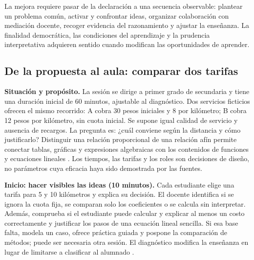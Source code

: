\documentclass[spanish,letterpaper,oneside]{article}
\begin{document}
La mejora requiere pasar de la declaración a una secuencia observable: plantear un problema común, activar y confrontar ideas, organizar colaboración con mediación docente, recoger evidencia del razonamiento y ajustar la enseñanza. La finalidad democrática, las condiciones del aprendizaje y la prudencia interpretativa adquieren sentido cuando modifican las oportunidades de aprender.

\subsection{De la propuesta al aula: comparar dos tarifas}

\textbf{Situación y propósito.} La sesión se dirige a primer grado de secundaria y tiene una duración inicial de 60 minutos, ajustable al diagnóstico. Dos servicios ficticios ofrecen el mismo recorrido: A cobra 30 pesos iniciales y 8 por kilómetro; B cobra 12 pesos por kilómetro, sin cuota inicial. Se supone igual calidad de servicio y ausencia de recargos. La pregunta es: ¿cuál conviene según la distancia y cómo justificarlo? Distinguir una relación proporcional de una relación afín permite conectar tablas, gráficas y expresiones algebraicas con los contenidos de funciones y ecuaciones lineales \citep[p.~59]{sep2024fase6}. Los tiempos, las tarifas y los roles son decisiones de diseño, no parámetros cuya eficacia haya sido demostrada por las fuentes.

\textbf{Inicio: hacer visibles las ideas (10 minutos).} Cada estudiante elige una tarifa para 5 y 10 kilómetros y explica su decisión. El docente identifica si se ignora la cuota fija, se comparan solo los coeficientes o se calcula sin interpretar. Además, comprueba si el estudiante puede calcular y explicar al menos un costo correctamente y justificar los pasos de una ecuación lineal sencilla. Si esa base falta, modela un caso, ofrece práctica guiada y pospone la comparación de métodos; puede ser necesaria otra sesión. El diagnóstico modifica la enseñanza en lugar de limitarse a clasificar al alumnado \citep{eef2017mathematics,star2015algebra}.
\end{document}
